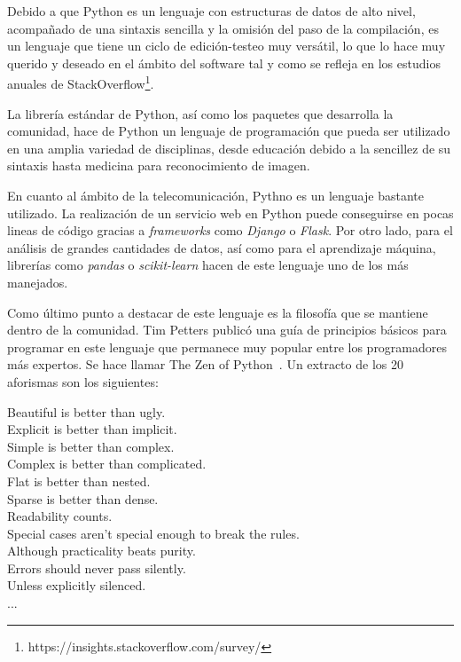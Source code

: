 \documentclass[a4paper, 12pt]{book}
\begin{document}
Debido a que Python es un lenguaje con estructuras de datos de alto nivel, acompañado de una sintaxis sencilla y la omisión del paso de la compilación, es un lenguaje que tiene un ciclo de edición-testeo muy versátil, lo que lo hace muy querido y deseado en el ámbito del software tal y como se refleja en los estudios anuales de StackOverflow\footnote{https://insights.stackoverflow.com/survey/}.

La librería estándar de Python, así como los paquetes que desarrolla la comunidad, hace de Python un lenguaje de programación que pueda ser utilizado en una amplia variedad de disciplinas, desde educación debido a la sencillez de su sintaxis hasta medicina para reconocimiento de imagen.

En cuanto al ámbito de la telecomunicación, Pythno es un lenguaje bastante utilizado. La realización de un servicio web en Python puede conseguirse en pocas lineas de código gracias a \textit{frameworks} como \textit{Django} o \textit{Flask}. Por otro lado, para el análisis de grandes cantidades de datos, así como para el aprendizaje máquina, librerías como \textit{pandas} o \textit{scikit-learn} hacen de este lenguaje uno de los más manejados.

Como último punto a destacar de este lenguaje es la filosofía que se mantiene dentro de la comunidad. Tim Petters publicó una guía de principios básicos para programar en este lenguaje que permanece muy popular entre los programadores más expertos. Se hace llamar The Zen of Python~\cite{peters2010zen}. Un extracto de los 20 aforismas son los siguientes:\\
\begin{itshape}
Beautiful is better than ugly.\\
Explicit is better than implicit.\\
Simple is better than complex.\\
Complex is better than complicated. \\
Flat is better than nested. \\
Sparse is better than dense. \\
Readability counts. \\
Special cases aren't special enough to break the rules. \\
Although practicality beats purity. \\
Errors should never pass silently. \\
Unless explicitly silenced. \\
... \\
\end{itshape}
\end{document}
